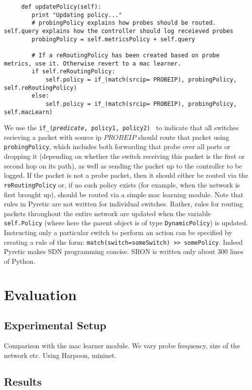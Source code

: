 \documentclass[pageno]{jpaper}
\begin{document}
	\begin{lstlisting}
	 def updatePolicy(self):
		print "Updating policy..."
		# probingPolicy explains how probes should be routed. self.query explains how the controller should log receieved probes
		probingPolicy = self.metricsPolicy + self.query

		# If a reRoutingPolicy has been created based on probe metrics, use it. Otherwise revert to a mac learner.
		if self.reRoutingPolicy:	
			self.policy = if_(match(srcip= PROBEIP), probingPolicy, self.reRoutingPolicy)
		else:
			self.policy = if_(match(srcip= PROBEIP), probingPolicy, self.macLearn)
	\end{lstlisting} 

We use the {\tt if\_({\it predicate}, policy1, policy2) } to indicate that all switches recieving a packet with source ip $PROBEIP$ should route that packet using {\tt probingPolicy}, which includes both forwarding that probe over all ports or dropping it (depending on whether the switch receiving this packet is the first or second hop on its path), as well as sending the packet up to the controller to be logged.  If the packet is not a probe packet, then it should either be routed via the {\tt reRoutingPolicy} or, if no such policy exists (for example, when the network is first brought up), should be routed via a simple mac learning module.  Note that rules in Pyretic are not written for individual switches.  Rather, rules for routing packets throughout the entire network are updated when the variable {\tt self.Policy} (where here the parent object is of type {\tt DynamicPolicy}) is updated.  Instructing only a particular switch to perform an action can be specified by creating a rule of the form: {\tt match(switch=someSwitch) >> somePolicy}.  Indeed Pyretic makes SDN programming concise. SRON is written only about 300 lines of Python.

\section{Evaluation}
\subsection{Experimental Setup}
Comparison with the mac learner module. We vary probe frequency, size of the network etc.
Using Harpoon, mininet.

\subsection{Results}
\end{document}
